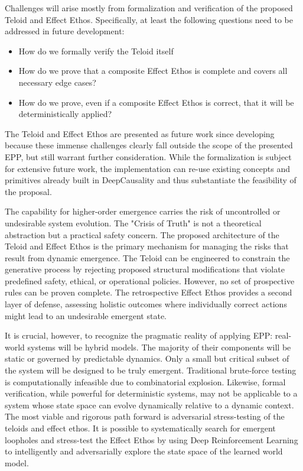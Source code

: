 Challenges will arise mostly from formalization and verification of the proposed Teloid and Effect Ethos. Specifically,
at least the following questions need to be addressed in future development:

\begin{itemize}
    \item How do we formally verify the Teloid itself
    \item How do we prove that a composite Effect Ethos is complete and covers all necessary edge cases?
    \item How do we prove, even if a composite Effect Ethos is correct, that it will be deterministically applied?
\end{itemize}

The Teloid and Effect Ethos are presented as future work since developing because these immense challenges clearly
fall outside the scope of the presented EPP, but still warrant further consideration. 
While the formalization is
subject for extensive future work, the implementation can re-use existing concepts and primitives already built in
DeepCausality and thus substantiate the feasibility of the proposal.


The capability for higher-order emergence carries the risk of uncontrolled or undesirable system evolution. The "Crisis of Truth" is not a theoretical abstraction but a practical safety concern. The proposed architecture of the Teloid and Effect Ethos is the primary mechanism for managing the risks that result from dynamic emergence. The Teloid can be engineered to constrain the generative process by rejecting proposed structural modifications that violate predefined safety, ethical, or operational policies. However, no set of prospective rules can be proven complete. The retrospective Effect Ethos provides a second layer of defense, assessing holistic outcomes where individually correct actions might lead to an undesirable emergent state. 

It is crucial, however, to recognize the pragmatic reality of applying EPP: real-world systems will be hybrid models. The majority of their components will be static or governed by predictable dynamics. Only a small but critical subset of the system will be designed to be truly emergent.
Traditional brute-force testing is computationally infeasible due to combinatorial explosion. 
Likewise, formal verification, while powerful for deterministic systems, may not be applicable to a system whose state space can evolve dynamically relative to a dynamic context.
The most viable and rigorous path forward is adversarial stress-testing of the teloids and effect ethos. 
It is possible to systematically search for emergent loopholes and stress-test the Effect Ethos
by using Deep Reinforcement Learning to intelligently and adversarially explore the state space of the learned world model.

